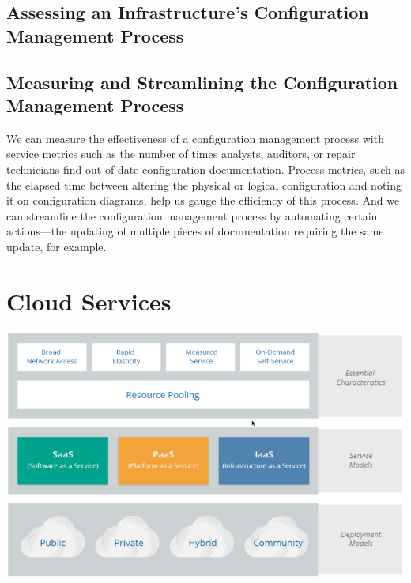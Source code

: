 \documentclass[a4]{article}
\begin{document}
\begin{multicols}{3}
\subsection{Assessing an Infrastructure’s Configuration Management Process}
\subsection{Measuring and Streamlining the Configuration Management Process}
We can measure the effectiveness of a configuration management process with service metrics such as the number of times
analysts, auditors, or repair technicians find out-of-date configuration documentation. 
Process metrics, such as the elapsed time between altering the physical or logical configuration and noting it on 
configuration diagrams, help us gauge the efficiency of this process. 
And we can streamline the configuration management process by automating certain actions—the updating of multiple 
pieces of documentation requiring the same update, for example.

\section{Cloud Services}
\includegraphics[width=\columnwidth]{cloud-services-1.png}


\end{multicols}
\end{document}
